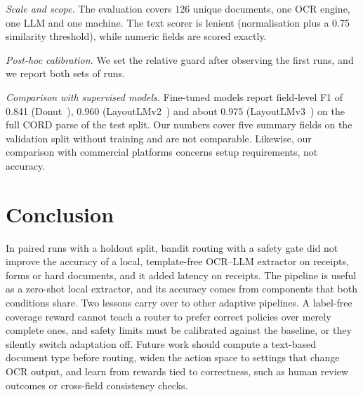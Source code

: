 \documentclass[conference,a4paper]{IEEEtran}
\begin{document}
\textit{Scale and scope.} The evaluation covers 126 unique documents, one OCR engine, one LLM and one machine. The text scorer is lenient (normalisation plus a 0.75 similarity threshold), while numeric fields are scored exactly.

\textit{Post-hoc calibration.} We set the relative guard after observing the first runs, and we report both sets of runs.

\textit{Comparison with supervised models.} Fine-tuned models report field-level F1 of 0.841 (Donut~\cite{donut}), 0.960 (LayoutLMv2~\cite{layoutlmv2}) and about 0.975 (LayoutLMv3~\cite{layoutlmv3}) on the full CORD parse of the test split. Our numbers cover five summary fields on the validation split without training and are not comparable. Likewise, our comparison with commercial platforms concerns setup requirements, not accuracy.

\section{Conclusion}
In paired runs with a holdout split, bandit routing with a safety gate did not improve the accuracy of a local, template-free OCR--LLM extractor on receipts, forms or hard documents, and it added latency on receipts. The pipeline is useful as a zero-shot local extractor, and its accuracy comes from components that both conditions share. Two lessons carry over to other adaptive pipelines. A label-free coverage reward cannot teach a router to prefer correct policies over merely complete ones, and safety limits must be calibrated against the baseline, or they silently switch adaptation off. Future work should compute a text-based document type before routing, widen the action space to settings that change OCR output, and learn from rewards tied to correctness, such as human review outcomes or cross-field consistency checks.
\end{document}
